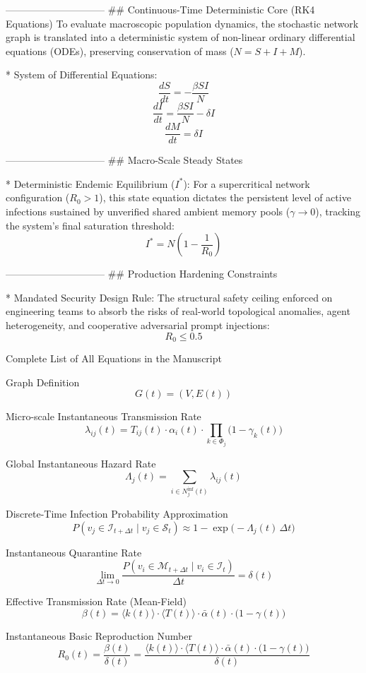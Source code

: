 ------------------------------
## Continuous-Time Deterministic Core (RK4 Equations)
To evaluate macroscopic population dynamics, the stochastic network graph is translated into a deterministic system of non-linear ordinary differential equations (ODEs), preserving conservation of mass ($N = S + I + M$).

* System of Differential Equations:
$$\frac{dS}{dt} = -\frac{\beta S I}{N}$$ 
$$\frac{dI}{dt} = \frac{\beta S I}{N} - \delta I$$ 
$$\frac{dM}{dt} = \delta I$$ 

------------------------------
## Macro-Scale Steady States

* Deterministic Endemic Equilibrium ($I^*$):
For a supercritical network configuration ($R_0 > 1$), this state equation dictates the persistent level of active infections sustained by unverified shared ambient memory pools ($\gamma \to 0$), tracking the system's final saturation threshold:
$$I^* = N \left(1 - \frac{1}{R_0}\right)$$ 

------------------------------
## Production Hardening Constraints

* Mandated Security Design Rule:
The structural safety ceiling enforced on engineering teams to absorb the risks of real-world topological anomalies, agent heterogeneity, and cooperative adversarial prompt injections:
$$R_0 \le 0.5$$ 

Complete List of All Equations in the Manuscript

Graph Definition
\[
G(t) = (V, E(t))
\]

Micro-scale Instantaneous Transmission Rate
\[
\lambda_{ij}(t) = T_{ij}(t) \cdot \alpha_i(t) \cdot \prod_{k \in \Phi_j} \bigl(1 - \gamma_k(t)\bigr)
\]

Global Instantaneous Hazard Rate
\[
\Lambda_j(t) = \sum_{i \in N_j^{\mathrm{inf}}(t)} \lambda_{ij}(t)
\]

Discrete-Time Infection Probability Approximation
\[
P(v_j \in \mathcal{I}_{t+\Delta t} \mid v_j \in \mathcal{S}_t) \approx 1 - \exp\bigl(-\Lambda_j(t)\,\Delta t\bigr)
\]

Instantaneous Quarantine Rate
\[
\lim_{\Delta t \to 0} \frac{P(v_i \in \mathcal{M}_{t+\Delta t} \mid v_i \in \mathcal{I}_t)}{\Delta t} = \delta(t)
\]

Effective Transmission Rate (Mean-Field)
\[
\beta(t) = \langle k(t) \rangle \cdot \langle T(t) \rangle \cdot \bar{\alpha}(t) \cdot \bigl(1 - \gamma(t)\bigr)
\]

Instantaneous Basic Reproduction Number
\[
R_0(t) = \frac{\beta(t)}{\delta(t)} = \frac{\langle k(t) \rangle \cdot \langle T(t) \rangle \cdot \bar{\alpha}(t) \cdot \bigl(1 - \gamma(t)\bigr)}{\delta(t)}
\]

